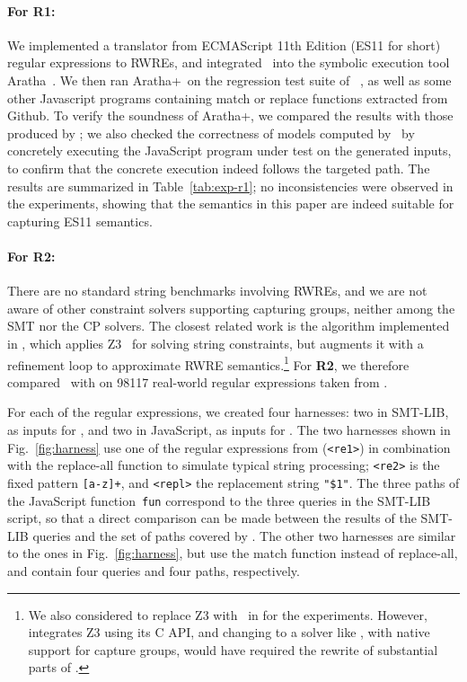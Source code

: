 \paragraph{For \textbf{R1}:} We implemented a translator from ECMAScript 11th Edition (ES11 for short) regular
expressions to RWREs, and integrated \ostrich\ into the symbolic
execution tool Aratha~\cite{aratha}. We then ran Aratha+\ostrich\ on
the regression test suite of \expose{}~\cite{DBLP:conf/spin/LoringMK17},
as well as some other Javascript programs containing match or replace
functions extracted from Github. To verify the soundness of
Aratha+\ostrich, we compared the results with those produced by
\expose{}; we also checked the correctness of models computed by
\ostrich\ by concretely executing the JavaScript program under test on
the generated inputs, to confirm that the concrete execution indeed
follows the targeted path. The results are summarized in Table~\ref{tab:exp-r1};
no inconsistencies were observed in the experiments, showing that the
semantics in this paper are indeed suitable for capturing ES11
semantics.

\paragraph{For \textbf{R2}:} There are no standard string benchmarks
involving RWREs, and we are not aware of other constraint solvers
supporting capturing groups, neither among the SMT nor the CP
solvers. %
The closest related work is the algorithm implemented in \expose{}, which
applies Z3~\cite{Z3} for solving string constraints, but augments
it with a refinement loop to approximate RWRE
semantics.\footnote{We also considered to replace Z3 with \ostrich\ in
  \expose{} for the experiments. However, \expose{} integrates Z3 using its
  C API, and changing to a solver like \ostrich, with native support
  for capture groups, would have required the rewrite of substantial
  parts of \expose{}.}
%
For \textbf{R2}, we therefore compared \ostrich\ with \expose{} on 98117
real-world regular expressions taken from \cite{DMC+19}.

For each of the regular expressions, we created four harnesses: two in
SMT-LIB, as inputs for \ostrich, and two in JavaScript, as inputs for
\expose{}. The two harnesses shown in Fig.~\ref{fig:harness} use one of the
regular expressions from \cite{DMC+19} (\verb!<re1>!) in combination with
the replace-all function to simulate typical string processing;
\verb!<re2>! is the fixed pattern \verb![a-z]+!, and \verb!<repl>! the
replacement string \verb!"$1"!. The three paths of the JavaScript
function~\verb!fun! correspond to the three queries in the SMT-LIB
script, so that a direct comparison can be made between the results of
the SMT-LIB queries and the set of paths covered by \expose{}. The other
two harnesses are similar to the ones in Fig.~\ref{fig:harness}, but
use the match function instead of replace-all, and contain four
queries and four paths, respectively.

